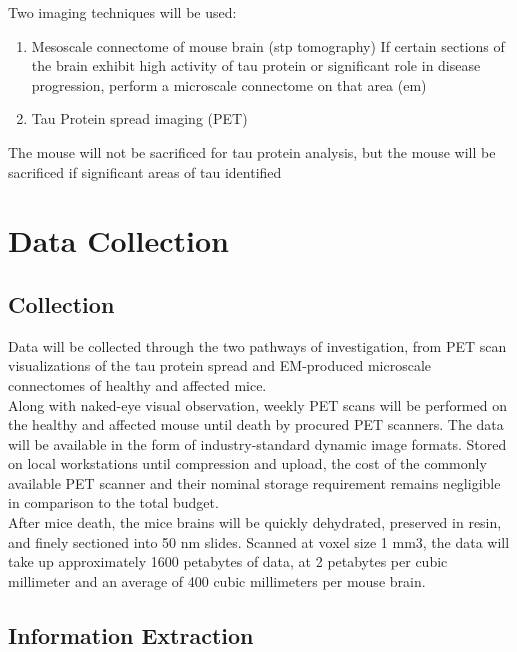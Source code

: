 \documentclass{article}
\newcommand{\ind}[0]{\indent}
\begin{document}
	Two imaging techniques will be used: \\
	
	\begin{enumerate}
	\item Mesoscale connectome of mouse brain (stp tomography)
If certain sections of the brain exhibit high activity of tau protein or significant role in disease progression, perform a microscale connectome on that area (em)
	\item Tau Protein spread imaging (PET)
	\end{enumerate}

	The mouse will not be sacrificed for tau protein analysis, but the mouse will be sacrificed if significant areas of tau identified


\section{Data Collection}

\subsection{Collection}

\ind\ind Data will be collected through the two pathways of investigation, from PET scan visualizations of the tau protein spread and EM-produced microscale connectomes of healthy and affected mice. \\

Along with naked-eye visual observation, weekly PET scans will be performed on the healthy and affected mouse until death by procured PET scanners. The data will be available in the form of industry-standard dynamic image formats. Stored on local workstations until compression and upload, the cost of the commonly available PET scanner and their nominal storage requirement remains negligible in comparison to the total budget. \\

After mice death, the mice brains will be quickly dehydrated, preserved in resin, and finely sectioned into 50 nm slides. Scanned at voxel size 1 mm3, the data will take up approximately 1600 petabytes of data, at 2 petabytes per cubic millimeter and an average of 400 cubic millimeters per mouse brain. 

\subsection{Information Extraction}
\end{document}
